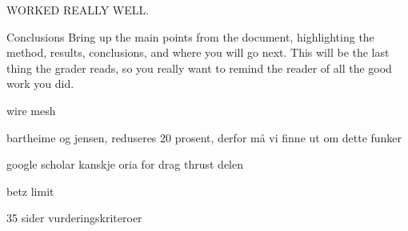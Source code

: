 
WORKED REALLY WELL.


Conclusions
Bring up the main points from the document, highlighting the method, results, conclusions, and where you will go next.  This will be the last thing the grader reads, so you really want to remind the reader of all the good work you did.




wire mesh 

bartheime og jensen, reduseres 20 prosent, derfor må vi finne ut om dette funker 
  
  
  
google scholar
kanskje oria 
for drag thrust delen

betz limit

35 sider 
vurderingskriteroer 
